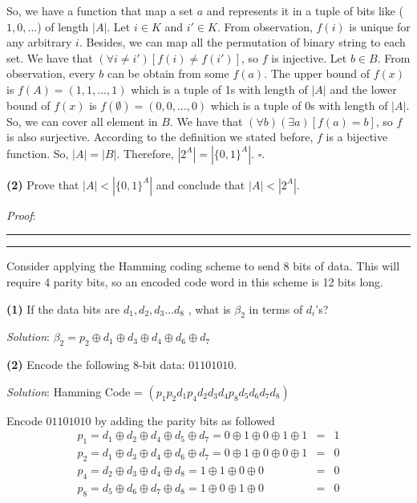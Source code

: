 \documentclass[a4paper, 11pt]{article}
\newcommand{\question}[2] {\vspace{.25in} \hrule\vspace{0.5em}
	\noindent{\bf #1: #2} \vspace{0.5em}
	\hrule \vspace{.10in}}
\renewcommand{\part}[1] {\vspace{.10in} {\bf (#1)}}
\begin{document}
	So, we have a function that map a set $a$ and represents it in a tuple of bits like ($1,0,...$) of length $|A|$.
	Let $i \in K$ and $i' \in K$. From observation, $f(i)$ is unique for any arbitrary $i$. Besides, we can map all the permutation of binary string to each set. We have that $ ( \forall i \neq i')[ f(i) \neq f(i')]$, so $f$ is injective. Let $b \in B$. From observation, every $b$ can be obtain from some $f(a)$. The upper bound of $f(x)$ is $f(A) = (1,1,...,1)$ which is a tuple of 1s with length of $|A|$ and the lower bound of $f(x)$ is $f(\emptyset) = (0,0,...,0)$ which is a tuple of 0s with length of $|A|$. So, we can cover all element in $B$.
	We have that $ ( \forall b)( \exists a)[ f(a) = b]$, so $f$ is also surjective. According to the definition we stated before, $f$ is a bijective function. So, $|A| = |B|$. Therefore,  $|2^A| = |\{0, 1\}^A|$. $\square$.
	
	\part{2} Prove that $|A| < |\{0, 1\}^A|$ and conclude that $|A| < |2^A|$.
	
	{\em Proof}: %
	
	
	\question{3}{Hamming Code}
	
	Consider applying the Hamming coding scheme to send 8 bits of data. This will require 4 parity bits, so an encoded code word in this scheme is 12 bits long.
	
	\part{1} If the data bits are $d_1,d_2,d_3...d_8$ , what is $\beta_2$ in terms of $d_i$’s?
	
	{\em Solution}: $\beta_2 = p_2 \oplus d_1 \oplus d_3 \oplus d_4 \oplus d_6 \oplus d_7$
	
	\part{2} Encode the following 8-bit data: $01101010$.
	
	{\em Solution}: Hamming Code = $(p_1 p_2 d_1 p_4 d_2 d_3 d_4 p_8 d_5 d_6 d_7 d_8)$
	
	Encode $01101010$ by adding the parity bits as followed
	\begin{eqnarray}
	p_1 = d_1 \oplus d_2 \oplus d_4 \oplus d_5 \oplus d_7 = 0 \oplus 1 \oplus 0 \oplus 1 \oplus 1 &=& 1\\
	p_2 = d_1 \oplus d_3 \oplus d_4 \oplus d_6 \oplus d_7  = 0 \oplus 1 \oplus 0 \oplus 0 \oplus 1 &=& 0\\
	p_4 = d_2 \oplus d_3 \oplus d_4 \oplus d_8 = 1 \oplus 1 \oplus 0 \oplus 0 &=& 0\\
	p_8 = d_5 \oplus d_6 \oplus d_7 \oplus d_8 = 1 \oplus 0 \oplus 1 \oplus 0 &=& 0
	\end{eqnarray}
	
\end{document}
